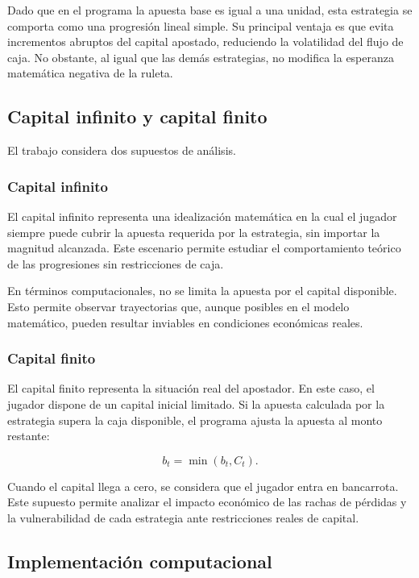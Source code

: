 \documentclass{article}
\begin{document}
Dado que en el programa la apuesta base es igual a una unidad, esta estrategia se comporta como una progresión lineal simple. Su principal ventaja es que evita incrementos abruptos del capital apostado, reduciendo la volatilidad del flujo de caja. No obstante, al igual que las demás estrategias, no modifica la esperanza matemática negativa de la ruleta.

\subsection{Capital infinito y capital finito}

El trabajo considera dos supuestos de análisis.

\subsubsection{Capital infinito}

El capital infinito representa una idealización matemática en la cual el jugador siempre puede cubrir la apuesta requerida por la estrategia, sin importar la magnitud alcanzada. Este escenario permite estudiar el comportamiento teórico de las progresiones sin restricciones de caja.

En términos computacionales, no se limita la apuesta por el capital disponible. Esto permite observar trayectorias que, aunque posibles en el modelo matemático, pueden resultar inviables en condiciones económicas reales.

\subsubsection{Capital finito}

El capital finito representa la situación real del apostador. En este caso, el jugador dispone de un capital inicial limitado. Si la apuesta calculada por la estrategia supera la caja disponible, el programa ajusta la apuesta al monto restante:

\begin{equation}
    b_t = \min(b_t, C_t).
\end{equation}

Cuando el capital llega a cero, se considera que el jugador entra en bancarrota. Este supuesto permite analizar el impacto económico de las rachas de pérdidas y la vulnerabilidad de cada estrategia ante restricciones reales de capital.

\subsection{Implementación computacional}
\end{document}
